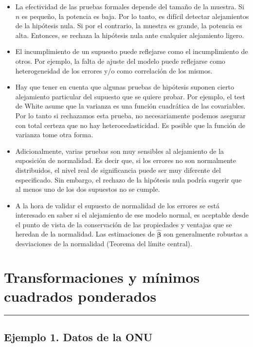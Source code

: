 \documentclass[
]{article}
\providecommand{\tightlist}{%
  \setlength{\itemsep}{0pt}\setlength{\parskip}{0pt}}
\begin{document}
\begin{itemize}
\tightlist
\item
  La efectividad de las pruebas formales depende del tamaño de la muestra. Si \(n\) es pequeño, la potencia es baja. Por lo tanto, es difícil detectar alejamientos de la hipótesis nula. Si por el contrario, la muestra es grande, la potencia es alta. Entonces, se rechaza la hipótesis nula ante cualquier alejamiento ligero.
\item
  El incumplimiento de un supuesto puede reflejarse como el incumplimiento de otros. Por ejemplo, la falta de ajuste del modelo puede reflejarse como heterogeneidad de los errores y/o como correlación de los mismos.
\item
  Hay que tener en cuenta que algunas pruebas de hipótesis suponen cierto alejamiento particular del supuesto que se quiere probar. Por ejemplo, el test de White asume que la varianza es una función cuadrática de las covariables. Por lo tanto si rechazamos esta prueba, no necesariamente podemos asegurar con total certeza que no hay heterocedasticidad. Es posible que la función de varianza tome otra forma.
\item
  Adicionalmente, varias pruebas son muy sensibles al alejamiento de la suposición de normalidad. Es decir que, si los errores no son normalmente distribuidos, el nivel real de significancia puede ser muy diferente del especificado. Sin embargo, el rechazo de la hipótesis nula podría sugerir que al menos uno de los dos supuestos no se cumple.
\item
  A la hora de validar el supuesto de normalidad de los errores se está interesado en saber si el alejamiento de ese modelo normal, es aceptable desde el punto de vista de la conservación de las propiedades y ventajas que se heredan de la normalidad. Las estimaciones de \(\widehat{\boldsymbol \beta}\) son generalmente robustas a desviaciones de la normalidad (Teorema del límite central).
\end{itemize}

\hypertarget{transformaciones-y-muxednimos-cuadrados-ponderados}{%
\section{Transformaciones y mínimos cuadrados ponderados}\label{transformaciones-y-muxednimos-cuadrados-ponderados}}

\rule{\textwidth}{0.4pt}

\hypertarget{ejemplo-1.-datos-de-la-onu}{%
\subsection*{Ejemplo 1. Datos de la ONU}\label{ejemplo-1.-datos-de-la-onu}}
\end{document}
